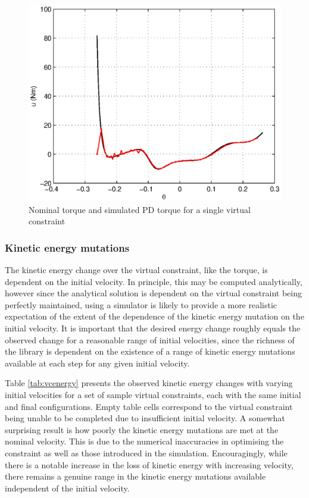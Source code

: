 \begin{figure}
\centering
\includegraphics[width=0.8\linewidth]{7Results/pdmatchesnom}
\caption{Nominal torque and simulated PD torque for a single virtual constraint}
\label{fig:pdmatchesnom}
\end{figure}


\subsubsection{Kinetic energy mutations}
The kinetic energy change over the virtual constraint, like the torque, is dependent on the initial velocity. In principle, this may be computed analytically, however since the analytical solution is dependent on the virtual constraint being perfectly maintained, using a simulator is likely to provide a more realistic expectation of the extent of the dependence of the kinetic energy mutation on the initial velocity. It is important that the desired energy change roughly equals the observed change for a reasonable range of initial velocities, since the richness of the library is dependent on the existence of a range of kinetic energy mutations available at each step for any given initial velocity.

Table \ref{tab:vcenergy} presents the observed kinetic energy changes with varying initial velocities for a set of sample virtual constraints, each with the same initial and final configurations. Empty table cells correspond to the virtual constraint being unable to be completed due to insufficient initial velocity. A somewhat surprising result is how poorly the kinetic energy mutations are met at the nominal velocity. This is due to the numerical inaccuracies in optimising the constraint as well as those introduced in the simulation. Encouragingly, while there is a notable increase in the loss of kinetic energy with increasing velocity, there remains a genuine range in the kinetic energy mutations available independent of the initial velocity.

